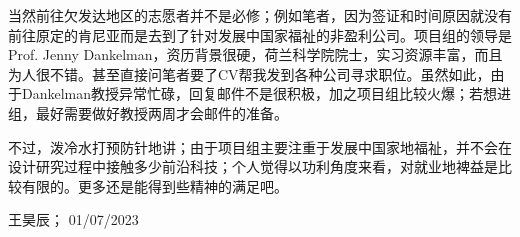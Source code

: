 当然前往欠发达地区的志愿者并不是必修；例如笔者，因为签证和时间原因就没有前往原定的肯尼亚而是去到了针对发展中国家福祉的非盈利公司。项目组的领导是Prof. Jenny Dankelman，资历背景很硬，荷兰科学院院士，实习资源丰富，而且为人很不错。甚至直接问笔者要了CV帮我发到各种公司寻求职位。虽然如此，由于Dankelman教授异常忙碌，回复邮件不是很积极，加之项目组比较火爆；若想进组，最好需要做好教授两周才会邮件的准备。

不过，泼冷水打预防针地讲；由于项目组主要注重于发展中国家地福祉，并不会在设计研究过程中接触多少前沿科技；个人觉得以功利角度来看，对就业地裨益是比较有限的。更多还是能得到些精神的满足吧。
\begin{flushright}
王昊辰； 01/07/2023
\end{flushright}





